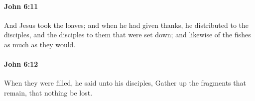 		\paragraph{John 6:11} %
			\label{JOHN-6-11}

			And Jesus took the loaves; and when he had given thanks, he distributed to the disciples, and the disciples to them that were set down; and likewise of the fishes as much as they would.

			\begin{framed}
			\scriptsize
				\begin{compactdesc}
					\item[SBLG] 
				\end{compactdesc}
			\end{framed}

		\paragraph{John 6:12} %
			\label{JOHN-6-12}

			When they were filled, he said unto his disciples, Gather up the fragments that remain, that nothing be lost.

